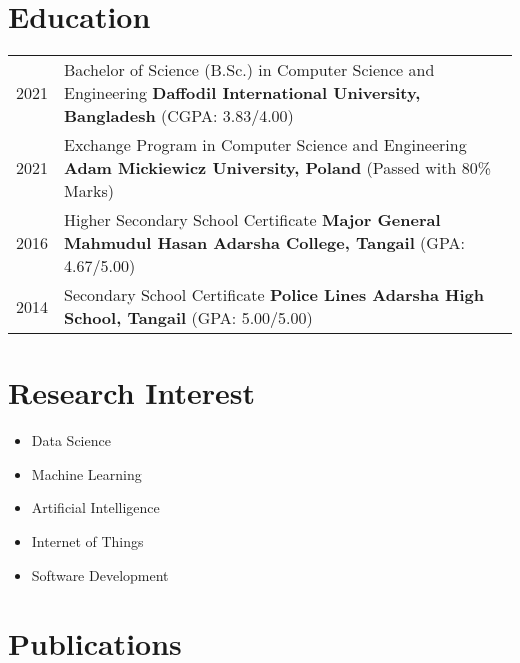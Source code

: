 \documentclass[a4paper, 12pt]{article}
\begin{document}
	\section{\textbf{Education}}
	\begin{tabularx}
		{\linewidth}{@{}l X@{}} 2021 & Bachelor of Science (B.Sc.) in Computer Science
		and Engineering
		\newline
		\textbf{Daffodil International University, Bangladesh} \hfill (CGPA: 3.83/4.00)
		\\

		2021 & Exchange Program in Computer Science and Engineering
		\newline
		\textbf{Adam Mickiewicz University, Poland} \hfill (Passed with 80\% Marks)
		\\

		2016 & Higher Secondary School Certificate
		\newline
		\textbf{Major General Mahmudul Hasan Adarsha College, Tangail} \hfill (GPA:
		4.67/5.00) \\

		2014 & Secondary School Certificate
		\newline
		\textbf{Police Lines Adarsha High School, Tangail} \hfill (GPA: 5.00/5.00)
		\\
	\end{tabularx}

	\section{\textbf{Research Interest}}

	\begin{itemize}[leftmargin=*,itemsep=2pt,parsep=0pt]
		\item Data Science

		\item Machine Learning

		\item Artificial Intelligence

		\item Internet of Things

		\item Software Development
	\end{itemize}

	\section{\textbf{Publications}}
	\begin{refsection}
		 \nocite{*}
		\printbibliography
		[heading=none]
	\end{refsection}
\end{document}
